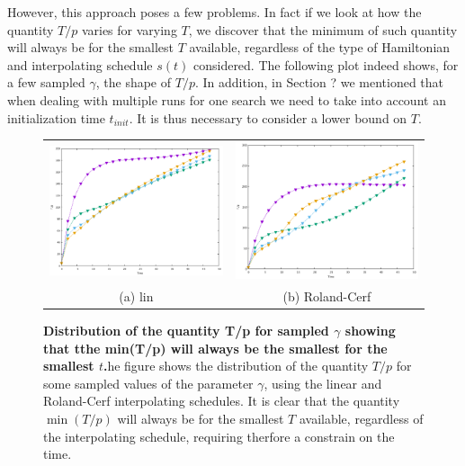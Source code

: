         \noindent
        However, this approach poses a few problems. In fact if we look at how the quantity $T/p$ varies for varying $T$, we discover that the minimum of such quantity will always be for the smallest $T$ available, regardless of the type of Hamiltonian and interpolating schedule $s(t)$ considered. The following plot indeed shows, for a few sampled $\gamma$, the shape of $T/p$. In addition, in Section ? we mentioned that when dealing with multiple runs for one search we need to take into account an initialization time $t_{init}$. It is thus necessary to consider a lower bound on $T$.
        \begin{figure}[ht]
        \centering
        \begin{tabular}{cc}
          \includegraphics[width=75mm]{./figures/sampled_t_over_p/T_p_lin.pdf} &   \includegraphics[width=75mm]{./figures/sampled_t_over_p/T_p_cerf.pdf} \\
        (a) lin & (b) Roland-Cerf\\[6pt]
        \end{tabular}
        \caption[$T/p$ distribution for sampled $\gamma$ showing that the minimum will always be for the smallest $t$ ]{\textbf{Distribution of the quantity T/p for sampled $\gamma$ showing that tthe min(T/p) will always be the smallest for the smallest $t$.}he figure shows the distribution of the quantity $T/p$ for some sampled values of the parameter $\gamma$, using the linear and Roland-Cerf interpolating schedules. It is clear that the quantity $\min(T/p)$ will always be for the smallest $T$ available, regardless of the interpolating schedule, requiring therfore a constrain on the time.}
        \end{figure}

